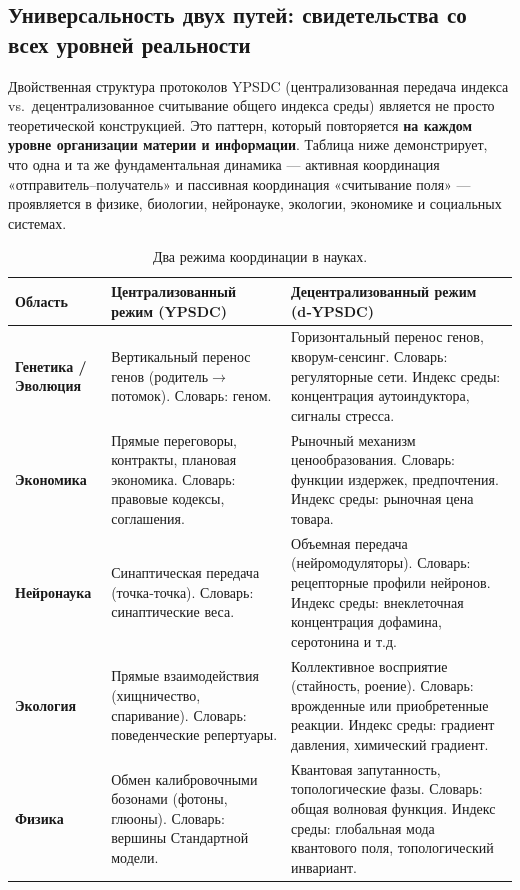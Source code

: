 \documentclass[11pt,a4paper]{article}
\begin{document}
	
	
	\subsection{Универсальность двух путей: свидетельства со всех уровней реальности}
	\label{subsec:universality-two-paths}
	
	Двойственная структура протоколов YPSDC (централизованная передача индекса vs.\
	децентрализованное считывание общего индекса среды) является не просто
	теоретической конструкцией. Это паттерн, который повторяется \textbf{на каждом уровне
		организации материи и информации}. Таблица ниже демонстрирует, что
	одна и та же фундаментальная динамика — активная координация «отправитель–получатель» и
	пассивная координация «считывание поля» — проявляется в физике, биологии,
	нейронауке, экологии, экономике и социальных системах.
	
	\begin{table}[htbp]
		\centering
		\caption{Два режима координации в науках.}
		\label{tab:two-regimes-sciences}
		\large
		\begin{tabular}{p{3.0cm}p{5.5cm}p{6.5cm}}
			\toprule
			\textbf{Область} & \textbf{Централизованный режим (YPSDC)} & \textbf{Децентрализованный режим (d‑YPSDC)} \\
			\midrule
			\textbf{Генетика / Эволюция} &
			Вертикальный перенос генов (родитель$\to$потомок).
			Словарь: геном. &
			Горизонтальный перенос генов, кворум-сенсинг.
			Словарь: регуляторные сети.
			Индекс среды: концентрация аутоиндуктора, сигналы стресса. \\
			\midrule
			\textbf{Экономика} &
			Прямые переговоры, контракты, плановая экономика.
			Словарь: правовые кодексы, соглашения. &
			Рыночный механизм ценообразования.
			Словарь: функции издержек, предпочтения.
			Индекс среды: рыночная цена товара. \\
			\midrule
			\textbf{Нейронаука} &
			Синаптическая передача (точка‑точка).
			Словарь: синаптические веса. &
			Объемная передача (нейромодуляторы).
			Словарь: рецепторные профили нейронов.
			Индекс среды: внеклеточная концентрация дофамина, серотонина и т.д. \\
			\midrule
			\textbf{Экология} &
			Прямые взаимодействия (хищничество, спаривание).
			Словарь: поведенческие репертуары. &
			Коллективное восприятие (стайность, роение).
			Словарь: врожденные или приобретенные реакции.
			Индекс среды: градиент давления, химический градиент. \\
			\midrule
			\textbf{Физика} &
			Обмен калибровочными бозонами (фотоны, глюоны).
			Словарь: вершины Стандартной модели. &
			Квантовая запутанность, топологические фазы.
			Словарь: общая волновая функция.
			Индекс среды: глобальная мода квантового поля, топологический инвариант. \\
			\bottomrule
		\end{tabular}
	\end{table}
	
\end{document}

